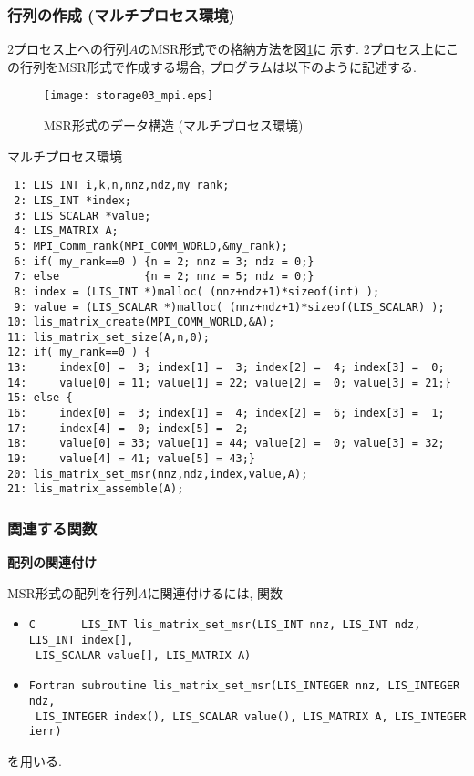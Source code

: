 \documentclass[a4paper]{jarticle}
\begin{document}
{{\subsubsection{行列の作成 (マルチプロセス環境)}
2プロセス上への行列$A$のMSR形式での格納方法を図\ref{fig:storage03_mpi}に
示す. 
2プロセス上にこの行列をMSR形式で作成する場合, プログラムは以下のように記述する. 
\begin{figure}[h]
{\centering 
\texttt{[image: storage03\_mpi.eps]} 
\caption{MSR形式のデータ構造 (マルチプロセス環境)}\label{fig:storage03_mpi}}
\end{figure}
\begin{itembox}[l]{マルチプロセス環境}
\small
\begin{verbatim}
 1: LIS_INT i,k,n,nnz,ndz,my_rank;
 2: LIS_INT *index;
 3: LIS_SCALAR *value;
 4: LIS_MATRIX A;
 5: MPI_Comm_rank(MPI_COMM_WORLD,&my_rank);
 6: if( my_rank==0 ) {n = 2; nnz = 3; ndz = 0;}
 7: else             {n = 2; nnz = 5; ndz = 0;}
 8: index = (LIS_INT *)malloc( (nnz+ndz+1)*sizeof(int) );
 9: value = (LIS_SCALAR *)malloc( (nnz+ndz+1)*sizeof(LIS_SCALAR) );
10: lis_matrix_create(MPI_COMM_WORLD,&A);
11: lis_matrix_set_size(A,n,0);
12: if( my_rank==0 ) {
13:     index[0] =  3; index[1] =  3; index[2] =  4; index[3] =  0;
14:     value[0] = 11; value[1] = 22; value[2] =  0; value[3] = 21;}
15: else {
16:     index[0] =  3; index[1] =  4; index[2] =  6; index[3] =  1;
17:     index[4] =  0; index[5] =  2;
18:     value[0] = 33; value[1] = 44; value[2] =  0; value[3] = 32;
19:     value[4] = 41; value[5] = 43;}
20: lis_matrix_set_msr(nnz,ndz,index,value,A);
21: lis_matrix_assemble(A);
\end{verbatim}
\end{itembox}

\subsubsection{関連する関数}
\noindent
{\bf 配列の関連付け}

MSR形式の配列を行列$A$に関連付けるには, 関数
\begin{itemize}
\item \verb|C       LIS_INT lis_matrix_set_msr(LIS_INT nnz, LIS_INT ndz, LIS_INT index[],|\\
      \verb| LIS_SCALAR value[], LIS_MATRIX A)|
\item \verb|Fortran subroutine lis_matrix_set_msr(LIS_INTEGER nnz, LIS_INTEGER ndz,|\\
      \verb| LIS_INTEGER index(), LIS_SCALAR value(), LIS_MATRIX A, LIS_INTEGER ierr)|
\end{itemize}
を用いる. 

}}
\end{document}
